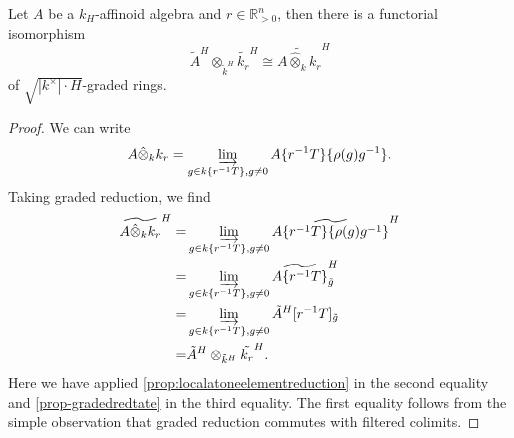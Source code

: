 \begin{corollary}\label{cor-baseextgradedextkr}
    Let $A$ be a $k_H$-affinoid algebra and $r\in \mathbb{R}^n_{>0}$, then there is a functorial isomorphism
    \[
        \tilde{A}^H\otimes_{\tilde{k}^H} \tilde{k_r}^H\cong \widetilde{A\hat{\otimes}_k k_r}^H
    \]
    of $\sqrt{|k^{\times}|\cdot H}$-graded rings.
\end{corollary}
\begin{proof}
    We can write
    \[
        A\hat{\otimes}_k k_r=\varinjlim_{g\in k\{r^{-1}T\},g\neq 0} A\{r^{-1}T\}\{\rho(g)g^{-1}\}.
    \]
    Taking graded reduction, we find
    \[
        \begin{aligned}
        \widetilde{A\hat{\otimes}_k k_r}^H=&\varinjlim_{g\in k\{r^{-1}T\},g\neq 0} \widetilde{A\{r^{-1}T\}\{\rho(g)g^{-1}\}}^H\\
        =&\varinjlim_{g\in k\{r^{-1}T\},g\neq 0} \widetilde{A\{r^{-1}T\}}^H_{\tilde{g}}\\
        =&\varinjlim_{g\in k\{r^{-1}T\},g\neq 0} \tilde{A}^H[r^{-1}T]_{\tilde{g}}\\
        =&\tilde{A}^H\otimes_{\tilde{k}^H} \tilde{k_r}^H.
        \end{aligned}
    \]
    Here we have applied \cref{prop:localatoneelementreduction} in the second equality and \cref{prop-gradedredtate} in the third equality. The first equality follows from the simple observation that graded reduction commutes with filtered colimits.
\end{proof}



